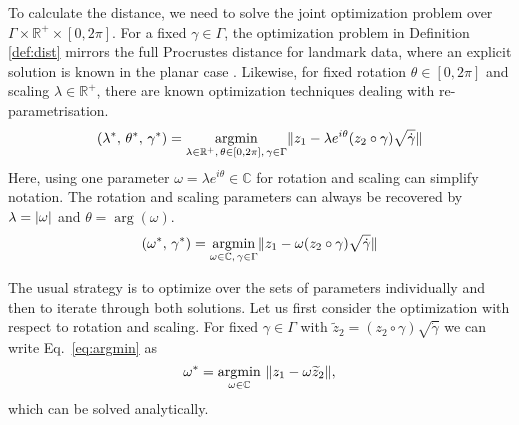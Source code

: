 To calculate the distance, we need to solve the joint optimization problem over $\Gamma \times \mathbb{R}^+ \times [0,2\pi]$.
For a fixed $\gamma \in \Gamma$, the optimization problem in Definition \ref{def:dist} mirrors the full Procrustes distance for landmark data, where an explicit solution is known in the planar case \parencite[see][Chapter~8]{DrydenMardia2016}.
Likewise, for fixed rotation $\theta \in [0,2\pi]$ and scaling $\lambda \in \mathbb{R}^+$, there are known optimization techniques dealing with re-parametrisation.
\begin{equation*}
  (\lambda^*,\, \theta^*,\, \gamma^*) = \operatorname*{argmin}_{\lambda \in \mathbb{R}^+,\, \theta \in [0,2\pi],\, \gamma \in \Gamma} \lVert z_1 - \lambda e^{i\theta} (z_2 \circ \gamma) \sqrt{\dot\gamma}\rVert
\end{equation*}
Here, using one parameter $\omega = \lambda e^{i\theta} \in \mathbb{C}$ for rotation and scaling can simplify notation.
The rotation and scaling parameters can always be recovered by $\lambda = \lvert\omega\rvert$ and $\theta = \arg(\omega)$.
\begin{equation}
  \label{eq:argmin}
  (\omega^*,\, \gamma^*) = \operatorname*{argmin}_{\omega \in \mathbb{C},\, \gamma \in \Gamma} \lVert z_1 - \omega (z_2 \circ \gamma) \sqrt{\dot\gamma}\rVert
\end{equation}

The usual strategy is to optimize over the sets of parameters individually and then to iterate through both solutions.
Let us first consider the optimization with respect to rotation and scaling.
For fixed $\gamma \in \Gamma$ with $\widetilde z_2 = (z_2 \circ \gamma) \sqrt{\dot\gamma}$ we can write Eq.\ \ref{eq:argmin} as
\begin{equation}
  \label{eq:argmin_rot}
  \omega^* = \operatorname*{argmin}_{\omega \in \mathbb{C}}\,\, \lVert z_1 - \omega \widetilde z_2\rVert,
\end{equation}
which can be solved analytically.

